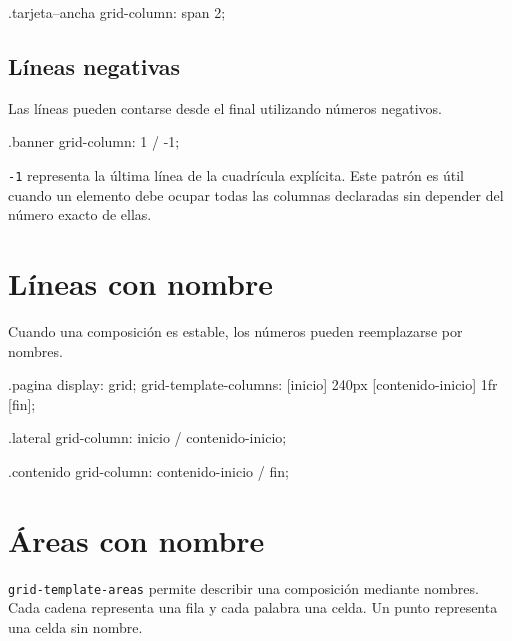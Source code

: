 \documentclass[11pt]{article}
\begin{document}
\begin{csscodedark}
.tarjeta--ancha {
    grid-column: span 2;
}
\end{csscodedark}


\subsection{Líneas negativas}

Las líneas pueden contarse desde el final utilizando números negativos.

\begin{csscodedark}
.banner {
    grid-column: 1 / -1;
}
\end{csscodedark}

\texttt{-1} representa la última línea de la cuadrícula explícita. Este patrón es
útil cuando un elemento debe ocupar todas las columnas declaradas sin depender
del número exacto de ellas.

\section{Líneas con nombre}

Cuando una composición es estable, los números pueden reemplazarse por nombres.

\begin{csscodedark}
.pagina {
    display: grid;
    grid-template-columns:
        [inicio] 240px
        [contenido-inicio] 1fr
        [fin];
}

.lateral {
    grid-column: inicio / contenido-inicio;
}

.contenido {
    grid-column: contenido-inicio / fin;
}
\end{csscodedark}


\section{Áreas con nombre}

\texttt{grid-template-areas} permite describir una composición mediante nombres.
Cada cadena representa una fila y cada palabra una celda. Un punto representa una
celda sin nombre.
\end{document}
